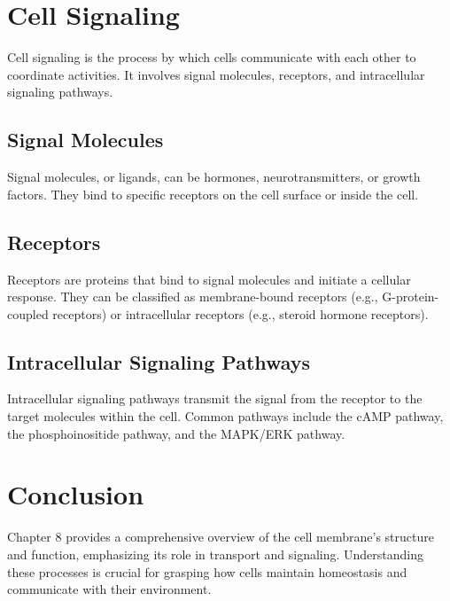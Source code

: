 \documentclass{article}
\begin{document}
\section{Cell Signaling}
Cell signaling is the process by which cells communicate with each other to coordinate activities. It involves signal molecules, receptors, and intracellular signaling pathways.

\subsection{Signal Molecules}
Signal molecules, or ligands, can be hormones, neurotransmitters, or growth factors. They bind to specific receptors on the cell surface or inside the cell.

\subsection{Receptors}
Receptors are proteins that bind to signal molecules and initiate a cellular response. They can be classified as membrane-bound receptors (e.g., G-protein-coupled receptors) or intracellular receptors (e.g., steroid hormone receptors).

\subsection{Intracellular Signaling Pathways}
Intracellular signaling pathways transmit the signal from the receptor to the target molecules within the cell. Common pathways include the cAMP pathway, the phosphoinositide pathway, and the MAPK/ERK pathway.

\section{Conclusion}
Chapter 8 provides a comprehensive overview of the cell membrane's structure and function, emphasizing its role in transport and signaling. Understanding these processes is crucial for grasping how cells maintain homeostasis and communicate with their environment.
\end{document}
